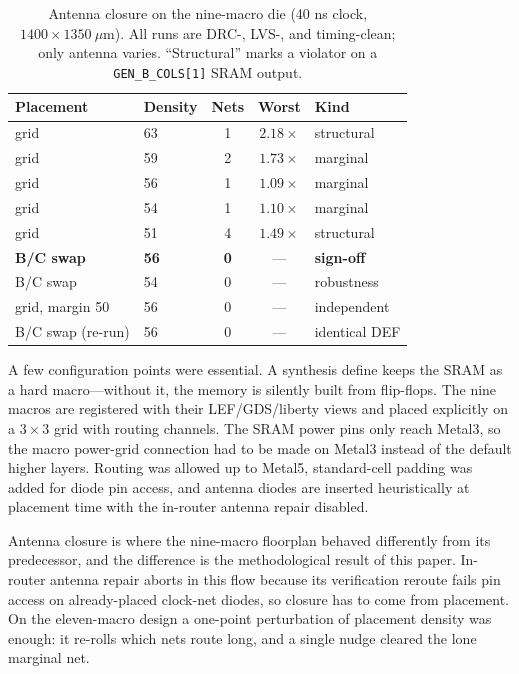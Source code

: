 \documentclass[conference,a4paper]{APSIPA2026}
\begin{document}
\begin{table}[!ht]
\caption{Antenna closure on the nine-macro die (40 ns clock, $1400\times1350~\mu$m). All runs are DRC-, LVS-, and timing-clean; only antenna varies. ``Structural'' marks a violator on a \texttt{GEN\_B\_COLS[1]} SRAM output.}
\label{tab:antenna}
\centering
\renewcommand{\arraystretch}{1.08}
\begin{tabular}{@{}llccl@{}}
\toprule
Placement & Density & Nets & Worst & Kind \\
\midrule
grid            & 63 & 1 & $2.18\times$ & structural \\
grid            & 59 & 2 & $1.73\times$ & marginal \\
grid            & 56 & 1 & $1.09\times$ & marginal \\
grid            & 54 & 1 & $1.10\times$ & marginal \\
grid            & 51 & 4 & $1.49\times$ & structural \\
\midrule
\textbf{B/C swap} & \textbf{56} & \textbf{0} & --- & \textbf{sign-off} \\
B/C swap        & 54 & 0 & --- & robustness \\
grid, margin 50 & 56 & 0 & --- & independent \\
B/C swap (re-run) & 56 & 0 & --- & identical DEF \\
\bottomrule
\end{tabular}
\end{table}
A few configuration points were essential. A synthesis define keeps the SRAM as a hard macro---without it, the memory is silently built from flip-flops. The nine macros are registered with their LEF/GDS/liberty views and placed explicitly on a $3\times3$ grid with routing channels. The SRAM power pins only reach Metal3, so the macro power-grid connection had to be made on Metal3 instead of the default higher layers. Routing was allowed up to Metal5, standard-cell padding was added for diode pin access, and antenna diodes are inserted heuristically at placement time with the in-router antenna repair disabled.

Antenna closure is where the nine-macro floorplan behaved differently from its predecessor, and the difference is the methodological result of this paper. In-router antenna repair aborts in this flow because its verification reroute fails pin access on already-placed clock-net diodes, so closure has to come from placement. On the eleven-macro design a one-point perturbation of placement density was enough: it re-rolls which nets route long, and a single nudge cleared the lone marginal net.
\end{document}
